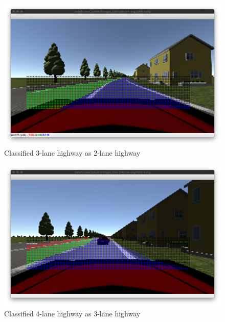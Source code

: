 \begin{figure}[H]
  \centering
  \includegraphics[scale=0.31]{images/Chapter5/lane3-red.png}
  \caption{Classified 3-lane highway as 2-lane highway}
  \label{fig:red-3}
\end{figure}
\begin{figure}[H]
  \centering
  \includegraphics[scale=0.31]{images/Chapter5/lane4-red.png}
  \caption{Classified 4-lane highway as 3-lane highway}
  \label{fig:red-4}
\end{figure}

